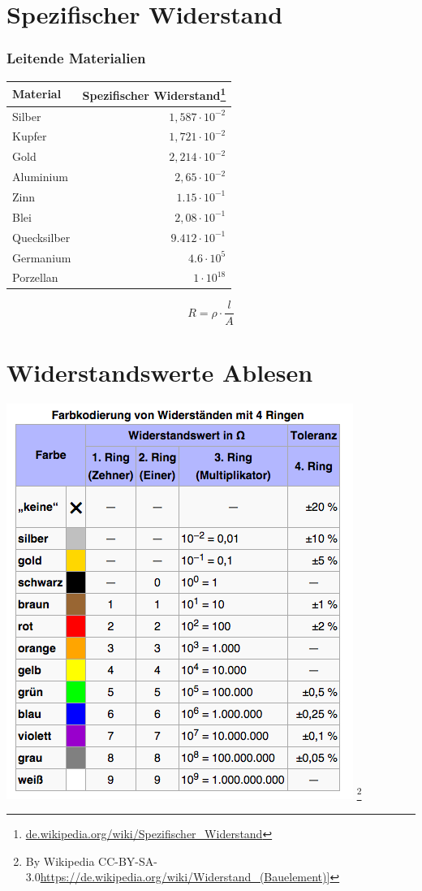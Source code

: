 \section*{Spezifischer Widerstand}

\begin{frame}
    \frametitle{Leitende Materialien}

     \begin{tabular}{lr}
  	Material & Spezifischer Widerstand\footnote{\tiny \url{de.wikipedia.org/wiki/Spezifischer_Widerstand}} \\ \hline
  	Silber & $1,587 \cdot 10^{-2}$ \\
  	Kupfer & $1,721 \cdot 10^{-2}$ \\
  	Gold & $2,214 \cdot 10^{-2}$ \\
  	Aluminium & $2,65 \cdot 10^{-2}$ \\
  	Zinn & $1.15 \cdot 10^{-1}$ \\
  	Blei & $2,08 \cdot 10^{-1}$ \\
  	Quecksilber & $9.412 \cdot 10^{-1}$ \\
  	Germanium & $4.6 \cdot 10^{5}$\\
  	Porzellan & $1 \cdot 10^{18}$ \\
 	\end{tabular}
 	
 	$$R = \rho \cdot \frac{l}{A}$$
 	

\end{frame}

\section*{Widerstandswerte Ablesen}

\begin{frame}
	\begin{center}
        \includegraphics[width=.74\textwidth]{e04/4-Ringe.png}
        \footnote{\tiny By Wikipedia CC-BY-SA-3.0\url{https://de.wikipedia.org/wiki/Widerstand_(Bauelement)}]}
\end{center}
\end{frame}

